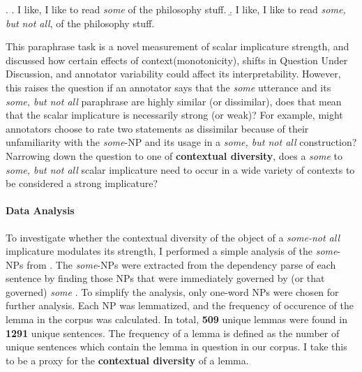 \documentclass[10pt, biblatex]{report}
\begin{document}
\ex.\label{ex:paraphrase} \a. I like, I like to read \textit{some} of the philosophy stuff.
     \b. I like, I like to read \textit{some, but not all}, of the philosophy stuff.

This paraphrase task is a novel measurement of scalar implicature strength,
and \citeauthor{degen_investigating_2015} discussed how certain effects of
context(monotonicity), shifts in Question Under Discussion, and annotator
variability could affect its interpretability. However, this raises the question
\dash if an annotator
says that the \textit{some} utterance and its \textit{some, but not all}
paraphrase are highly similar (or dissimilar), does that mean that the scalar
implicature is necessarily strong (or weak)? For example, might annotators choose
to rate two statements as dissimilar because of their unfamiliarity with the
\textit{some}-NP and its usage in a \textit{some, but not all} construction?
Narrowing down the
question to one of \textbf{contextual diversity}, does a \textit{some} to
\textit{some, but not all} scalar implicature need to occur in a wide variety
of contexts to be considered a strong implicature?


\paragraph{Data Analysis} To investigate whether the contextual diversity of the
object of a \textit{some-not all} implicature modulates its strength, I performed
a simple analysis of the \textit{some}-NPs from \citet{degen_investigating_2015}.
The \textit{some}-NPs were extracted from the dependency parse of each sentence
\citep{qi2020stanza} by finding those NPs that were immediately governed by (or
that governed) \textit{some} \citep{white-EtAl:2016:EMNLP2016,
zhang-EtAl:2017:IWCS}. To simplify the analysis, only one-word NPs were chosen
for further analysis. Each NP was lemmatized, and the frequency of occurence of
the lemma in the corpus was calculated. In total, \textbf{509} unique lemmas
were found in \textbf{1291} unique sentences. The frequency of a lemma is defined
as the number of unique sentences which contain the lemma in question in our
corpus. I take this to be a proxy for the \textbf{contextual diversity} of a
lemma.
\end{document}
